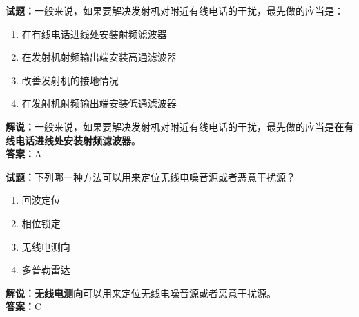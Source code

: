 \documentclass{ctexbook}
\begin{document}
\vspace{1em}

\textbf{试题：}一般来说，如果要解决发射机对附近有线电话的干扰，最先做的应当是：
\begin{enumerate}[leftmargin=3em]
  \item 在有线电话进线处安装射频滤波器
  \item 在发射机射频输出端安装高通滤波器
  \item 改善发射机的接地情况
  \item 在发射机射频输出端安装低通滤波器
\end{enumerate}
\noindent\textbf{解说：}一般来说，如果要解决发射机对附近有线电话的干扰，最先做的应当是\textbf{在有线电话进线处安装射频滤波器}。\\\noindent\textbf{答案：}A

\vspace{1em}

\textbf{试题：}下列哪一种方法可以用来定位无线电噪音源或者恶意干扰源？
\begin{enumerate}[leftmargin=3em]
  \item 回波定位
  \item 相位锁定
  \item 无线电测向
  \item 多普勒雷达
\end{enumerate}
\noindent\textbf{解说：}\textbf{无线电测向}可以用来定位无线电噪音源或者恶意干扰源。\\\noindent\textbf{答案：}C






%


\end{document}
